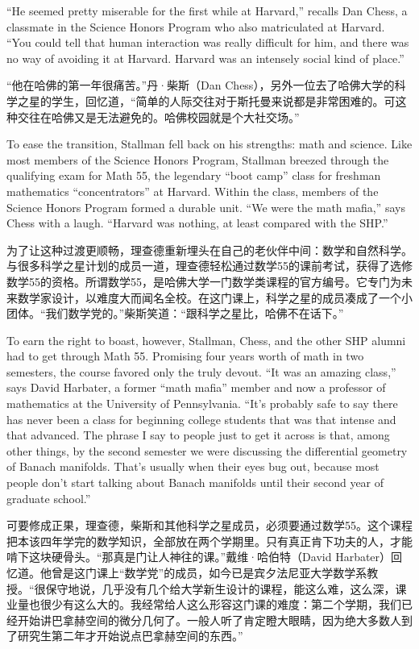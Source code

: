 \ifdefined\eng
``He seemed pretty miserable for the first while at Harvard,'' recalls Dan Chess, a classmate in the Science Honors Program who also matriculated at Harvard. ``You could tell that human interaction was really difficult for him, and there was no way of avoiding it at Harvard. Harvard was an intensely social kind of place.''
\fi

\ifdefined\chs
``他在哈佛的第一年很痛苦。''丹·柴斯（Dan
Chess），另外一位去了哈佛大学的科学之星的学生，回忆道，``简单的人际交往对于斯托曼来说都是非常困难的。可这种交往在哈佛又是无法避免的。哈佛校园就是个大社交场。''
\fi

\ifdefined\eng
To ease the transition, Stallman fell back on his strengths: math and science. Like most members of the Science Honors Program, Stallman breezed through the qualifying exam for Math 55, the legendary ``boot camp'' class for freshman mathematics ``concentrators'' at Harvard. Within the class, members of the Science Honors Program formed a durable unit. ``We were the math mafia,'' says Chess with a laugh. ``Harvard was nothing, at least compared with the SHP.''
\fi

\ifdefined\chs
为了让这种过渡更顺畅，理查德重新埋头在自己的老伙伴中间：数学和自然科学。与很多科学之星计划的成员一道，理查德轻松通过数学55的课前考试，获得了选修数学55的资格。所谓数学55，是哈佛大学一门数学类课程的官方编号。它专门为未来数学家设计，以难度大而闻名全校。在这门课上，科学之星的成员凑成了一个小团体。``我们数学党的。''柴斯笑道：``跟科学之星比，哈佛不在话下。''
\fi

\ifdefined\eng
To earn the right to boast, however, Stallman, Chess, and the other SHP alumni had to get through Math 55. Promising four years worth of math in two semesters, the course favored only the truly devout. ``It was an amazing class,'' says David Harbater, a former ``math mafia'' member and now a professor of mathematics at the University of Pennsylvania. ``It's probably safe to say there has never been a class for beginning college students that was that intense and that advanced. The phrase I say to people just to get it across is that, among other things, by the second semester we were discussing the differential geometry of Banach manifolds. That's usually when their eyes bug out, because most people don't start talking about Banach manifolds until their second year of graduate school.''
\fi

\ifdefined\chs
可要修成正果，理查德，柴斯和其他科学之星成员，必须要通过数学55。这个课程把本该四年学完的数学知识，全部放在两个学期里。只有真正肯下功夫的人，才能啃下这块硬骨头。``那真是门让人神往的课。''戴维·哈伯特（David Harbater）回忆道。他曾是这门课上``数学党''的成员，如今已是宾夕法尼亚大学数学系教授。``很保守地说，几乎没有几个给大学新生设计的课程，能这么难，这么深，课业量也很少有这么大的。我经常给人这么形容这门课的难度：第二个学期，我们已经开始讲巴拿赫空间的微分几何了。一般人听了肯定瞪大眼睛，因为绝大多数人到了研究生第二年才开始说点巴拿赫空间的东西。''
\fi

